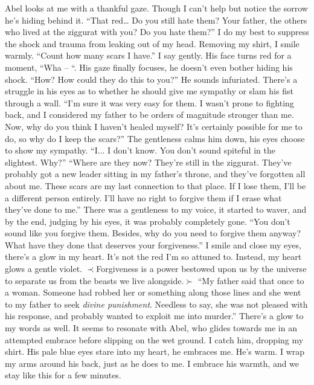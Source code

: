 \documentclass[openany, 12pt]{book}
\newcommand\tab[1][1cm]{\hspace*{#1}}
\begin{document}
\newline
\tab
Abel looks at me with a thankful gaze. Though I can’t help but notice the sorrow he’s hiding behind it. ``That red… Do you still hate them? Your father, the others who lived at the ziggurat with you? Do you hate them?''
\newline
\tab
I do my best to suppress the shock and trauma from leaking out of my head. Removing my shirt, I smile warmly. ``Count how many scars I have.'' I say gently. 
\newline
\tab
His face turns red for a moment, ``Wha – ``. His gaze finally focuses, he doesn’t even bother hiding his shock. ``How? How could they do this to you?'' He sounds infuriated. There’s a struggle in his eyes as to whether he should give me sympathy or slam his fist through a wall.
\newline
\tab
``I’m sure it was very easy for them. I wasn’t prone to fighting back, and I considered my father to be orders of magnitude stronger than me. Now, why do you think I haven’t healed myself? It’s certainly possible for me to do, so why do I keep the scars?'' The gentleness calms him down, his eyes choose to show my sympathy.
\newline
\tab
``I... I don’t know. You don’t sound spiteful in the slightest. Why?''
\newline
\tab
``Where are they now? They’re still in the ziggurat. They’ve probably got a new leader sitting in my father’s throne, and they’ve forgotten all about me. These scars are my last connection to that place. If I lose them, I’ll be a different person entirely. I’ll have no right to forgive them if I erase what they’ve done to me.'' There was a gentleness to my voice, it started to waver, and by the end, judging by his eyes, it was probably completely gone.
\newline
\tab
``You don’t sound like you forgive them. Besides, why do you need to forgive them anyway? What have they done that deserves your forgiveness.''
\newline
\tab
I smile and close my eyes, there’s a glow in my heart. It’s not the red I’m so attuned to. Instead, my heart glows a gentle violet. 
\newline
\tab
$\prec$Forgiveness is a power bestowed upon us by the universe to separate us from the beasts we live alongside.$\succ$
\newline
\tab
``My father said that once to a woman. Someone had robbed her or something along those lines and she went to my father to seek \textit{divine punishment}. Needless to say, she was not pleased with his response, and probably wanted to exploit me into murder.'' There’s a glow to my words as well. It seems to resonate with Abel, who glides towards me in an attempted embrace before slipping on the wet ground. I catch him, dropping my shirt. His pale blue eyes stare into my heart, he embraces me. He’s warm. I wrap my arms around his back, just as he does to me. I embrace his warmth, and we stay like this for a few minutes.
\end{document}
